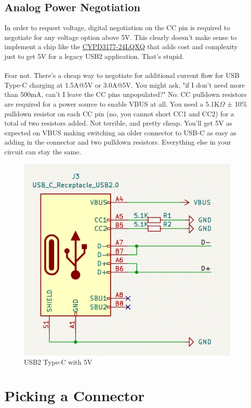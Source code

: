 \documentclass[12pt]{article}
\begin{document}
\subsection{Analog Power Negotiation} \label{sec:AnalogPower}
In order to request voltage, digital negotiation on the CC pin is required to negotiate for any voltage option above 5V. This clearly doesn't make sense to implement a chip like the \href{https://www.infineon.com/dgdl/Infineon-EZ-PD_BCR_Datasheet_USB_Type-C_Port_Controller_for_Power_Sinks-DataSheet-v03_00-EN.pdf?fileId=8ac78c8c7d0d8da4017d0ee7ce9d70ad}{CYPD3177-24LQXQ} that adds cost and complexity just to get 5V for a legacy USB2 application. That's stupid.\\\\
\noindent
Fear not. There's a cheap way to negotiate for additional current flow for USB Type-C charging at 1.5A@5V or 3.0A@5V. You might ask, "if I don't need more than 500mA, can't I leave the CC pins unpopulated?" No: CC pulldown resistors are required for a power source to enable VBUS at all. You need a 5.1K$\Omega$ ± 10\% pulldown resistor on each CC pin (no, you cannot short CC1 and CC2) for a total of two resistors added. Not terrible, and pretty cheap. You'll get 5V as expected on VBUS making switching an older connector to USB-C as easy as adding in the connector and two pulldown resistors. Everything else in your circuit can stay the same.

\begin{figure}[h]
	\centering
	\includegraphics[width=0.55\linewidth]{USB-C-Pulldown.png}
	\caption{USB2 Type-C with 5V}
	\label{fig:usb2_5V_usbc}
\end{figure}



\section{Picking a Connector}
\end{document}
